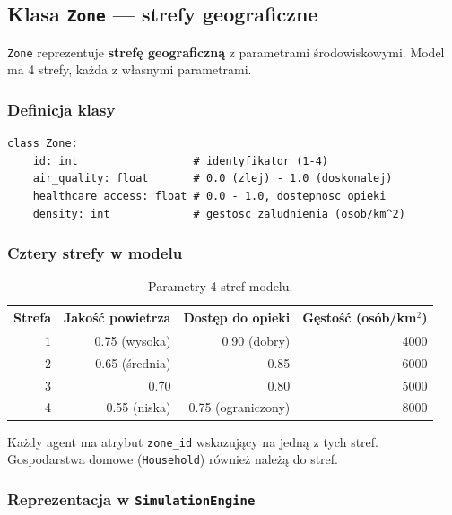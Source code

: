 \documentclass[11pt,a4paper]{article}
\begin{document}
\subsection{Klasa \texttt{Zone} --- strefy geograficzne}

\texttt{Zone} reprezentuje \textbf{strefę geograficzną} z parametrami środowiskowymi. Model ma 4 strefy, każda z własnymi parametrami.

\subsubsection{Definicja klasy}

\begin{lstlisting}
class Zone:
    id: int                  # identyfikator (1-4)
    air_quality: float       # 0.0 (zlej) - 1.0 (doskonalej)
    healthcare_access: float # 0.0 - 1.0, dostepnosc opieki
    density: int             # gestosc zaludnienia (osob/km^2)
\end{lstlisting}

\subsubsection{Cztery strefy w modelu}

\begin{table}[h]
\centering
\small
\begin{tabular}{rrrr}
\toprule
\textbf{Strefa} & \textbf{Jakość powietrza} & \textbf{Dostęp do opieki} & \textbf{Gęstość (osób/km$^2$)} \\
\midrule
1 & 0.75 (wysoka)  & 0.90 (dobry)           & 4000 \\
2 & 0.65 (średnia) & 0.85                   & 6000 \\
3 & 0.70           & 0.80                   & 5000 \\
4 & 0.55 (niska)   & 0.75 (ograniczony)     & 8000 \\
\bottomrule
\end{tabular}
\caption{Parametry 4 stref modelu.}
\end{table}

Każdy agent ma atrybut \texttt{zone\_id} wskazujący na jedną z tych stref. Gospodarstwa domowe (\texttt{Household}) również należą do stref.

\subsubsection{Reprezentacja w \texttt{SimulationEngine}}
\end{document}
